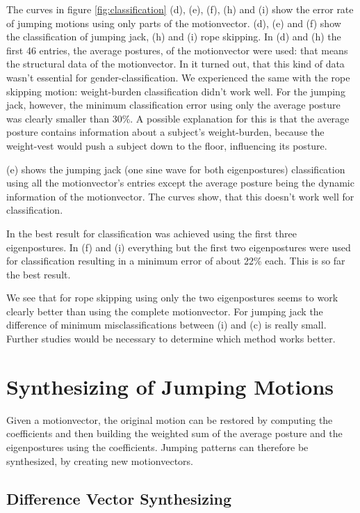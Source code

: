 \documentclass[a4paper]{article}
\begin{document}
The curves in figure \ref{fig:classification} (d), (e), (f), (h) and (i) show the error rate of jumping motions using only parts of the motionvector. (d), (e) and (f) show the classification of jumping jack, (h) and (i) rope skipping.
In (d) and (h) the first 46 entries, the average postures, of the motionvector were used: that means the structural data of the motionvector.
In \cite{origin} it turned out, that this kind of data wasn't essential for gender-classification.
We experienced the same with the rope skipping motion: weight-burden classification didn't work well.
For the jumping jack, however, the minimum classification error using only the average posture was clearly smaller than 30\%.
A possible explanation for this is that the average posture contains information about a subject's weight-burden, because the weight-vest would push a subject down to the floor, influencing its posture.

(e) shows the jumping jack (one sine wave for both eigenpostures) classification using all the motionvector's entries except the average posture being the dynamic information of the motionvector.
The curves show, that this doesn't work well for classification.

In \cite{origin} the best result for classification was achieved using the first three eigenpostures.
In (f) and (i) everything but the first two eigenpostures were used for classification resulting in a minimum error of about 22\% each.
This is so far the best result.

We see that for rope skipping using only the two eigenpostures seems to work clearly better than using the complete motionvector. For jumping jack the difference of minimum misclassifications between (i) and (c) is really small. Further studies would be necessary to determine which method works better.

\section{Synthesizing of Jumping Motions}

Given a motionvector, the original motion can be restored by computing the coefficients and then building the weighted sum of the average posture and the eigenpostures using the coefficients.
Jumping patterns can therefore be synthesized, by creating new motionvectors.

\subsection{Difference Vector Synthesizing}
\end{document}
